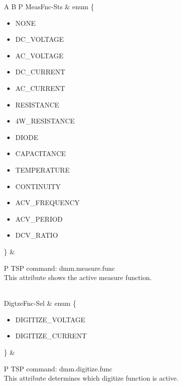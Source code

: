 \documentclass[openany]{article}
\begin{document}
\begin{longtable}{A B P}
		MeasFnc-Sts & enum \{\begin{itemize}[noitemsep]
					\small
					\item[] NONE
					\item[] DC\_VOLTAGE
					\item[] AC\_VOLTAGE
					\item[] DC\_CURRENT
					\item[] AC\_CURRENT
					\item[] RESISTANCE
					\item[] 4W\_RESISTANCE
					\item[] DIODE
					\item[] CAPACITANCE
					\item[] TEMPERATURE
					\item[] CONTINUITY
					\item[] ACV\_FREQUENCY
					\item[] ACV\_PERIOD
					\item[] DCV\_RATIO
					\end{itemize}\} & 
				\begin{tabular}{P}
					TSP command: dmm.measure.func \\
					This attribute shows the active measure function.
				\end{tabular} \\ \hline
		DigtzeFnc-Sel & enum \{\begin{itemize}[noitemsep]
					\small
					\item[] DIGITIZE\_VOLTAGE
					\item[] DIGITIZE\_CURRENT
					\end{itemize}\} &
				\begin{tabular}{P}
					TSP command: dmm.digitize.func \\
					This attribute determines which digitize function is active.
				\end{tabular} \\


\end{longtable}
\end{document}
